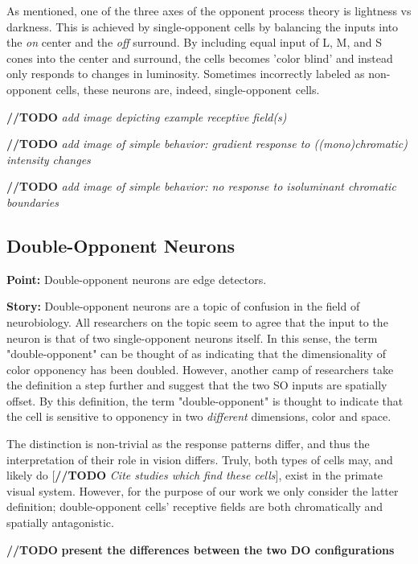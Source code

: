 \documentclass[journal,onecolumn]{IEEEtran}
\begin{document}
As mentioned, one of the three axes of the opponent process theory is lightness vs darkness. This is achieved by single-opponent cells by balancing the inputs into the \textit{on} center and the \textit{off} surround. By including equal input of L, M, and S cones into the center and surround, the cells becomes 'color blind' and instead only responds to changes in luminosity. Sometimes incorrectly labeled as non-opponent cells, these neurons are, indeed, single-opponent cells.

\textbf{//TODO} \textit{add image depicting example receptive field(s)}

\textbf{//TODO} \textit{add image of simple behavior: gradient response to ((mono)chromatic) intensity changes}

\textbf{//TODO} \textit{add image of simple behavior: no response to isoluminant chromatic boundaries}


\subsection*{Double-Opponent Neurons}

\textbf{Point:}
Double-opponent neurons are edge detectors. 

\textbf{Story:}
Double-opponent neurons are a topic of confusion in the field of neurobiology. All researchers on the topic seem to agree that the input to the neuron is that of two single-opponent neurons itself. In this sense, the term "double-opponent" can be thought of as indicating that the dimensionality of color opponency has been doubled. However, another camp of researchers take the definition a step further and suggest that the two SO inputs are spatially offset. By this definition, the term "double-opponent" is thought to indicate that the cell is sensitive to opponency in two \textit{different} dimensions, color and space.

The distinction is non-trivial as the response patterns differ, and thus the interpretation of their role in vision differs. Truly, both types of cells may, and likely do [\textbf{//TODO} \textit{Cite studies which find these cells}], exist in the primate visual system. However, for the purpose of our work we only consider the latter definition; double-opponent cells' receptive fields are both chromatically and spatially antagonistic.

\textbf{//TODO} \textbf{present the differences between the two DO configurations}
\end{document}
